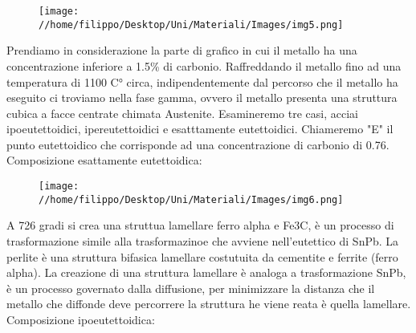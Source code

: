 \documentclass{article}%
\begin{document}
\begin{figure}[H]%
\centering%
\texttt{[image: //home/filippo/Desktop/Uni/Materiali/Images/img5.png]}%
\end{figure}

%
Prendiamo in considerazione la parte di grafico in cui il metallo ha una concentrazione inferiore a 1.5\% di carbonio.\newline%
%
Raffreddando il metallo fino ad una temperatura di 1100 C° circa, indipendentemente dal percorso che il metallo ha eseguito ci troviamo nella fase gamma, ovvero il metallo presenta una struttura cubica a facce centrate chimata Austenite.\newline%
%
Esamineremo tre casi, acciai ipoeutettoidici, ipereutettoidici e esatttamente eutettoidici. Chiameremo "E" il punto eutettoidico che corrisponde ad una concentrazione di carbonio di 0.76.\newline%
%
\newline%
%
Composizione esattamente eutettoidica:\newline%
%


\begin{figure}[H]%
\centering%
\texttt{[image: //home/filippo/Desktop/Uni/Materiali/Images/img6.png]}%
\end{figure}

%
A 726 gradi si crea una struttua lamellare ferro alpha e Fe3C, è un processo di trasformazione simile alla trasformazinoe che avviene nell'eutettico di SnPb.\newline%
%
La perlite è una struttura bifasica lamellare costutuita da cementite e ferrite (ferro alpha). La creazione di una struttura lamellare è analoga a trasformazione SnPb, è un processo governato dalla diffusione, per minimizzare la distanza che il metallo che diffonde deve percorrere la struttura he viene reata è quella lamellare.\newline%
%
\newline%
%
Composizione ipoeutettoidica:

%
\end{document}
